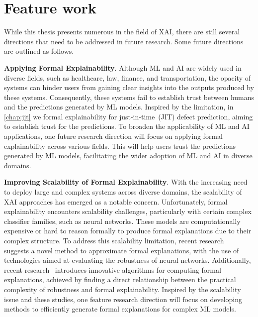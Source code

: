 \section*{Feature work}
While this thesis presents numerous  in the field of XAI, 
there are still several directions that need to be addressed in future research.
%
Some future directions are outlined as follows.

\textbf{Applying Formal Explainability}.
%
Although ML and AI are widely used in diverse fields, such as healthcare, law, finance, and transportation, 
the opacity of  systems can hinder users from gaining clear insights into 
the outputs produced by these systems.
%
Consequently, these systems fail to establish trust between humans and the
predictions generated by ML models.
%
Inspired by the limitation, in \autoref{chap:jit} we  formal explainability for
just-in-time~(JIT) defect prediction, aiming to establish trust for the predictions.
%
To broaden the applicability of ML and AI applications, one future research direction 
will focus on applying formal explainability across various fields.
%
This will help users trust the predictions generated by ML models, facilitating the wider 
adoption of ML and AI in diverse domains.

\textbf{Improving Scalability of Formal Explainability}.
%
With the increasing need to deploy large and complex  systems across diverse domains, 
the scalability of XAI approaches has emerged as a notable concern.
%
Unfortunately, formal explainability encounters scalability challenges, 
particularly with certain complex classifier families, such as neural networks.
%
These models are computationally expensive or hard to reason formally
to produce formal explanations due to their complex structure.
%
To address this scalability limitation, recent research~\cite{bk-tacas23} 
suggests a novel method to approximate formal explanations, with the use of 
technologies aimed at evaluating the robustness of neural networks.
%
Additionally, recent research~\cite{bk-tacas23} introduces innovative algorithms for computing
formal explanations, achieved by finding a direct relationship between 
the practical complexity of robustness and formal explainability.
%
Inspired by the scalability issue and these studies, one feature research direction
will focus on developing methods to efficiently
generate formal explanations for complex ML models.
